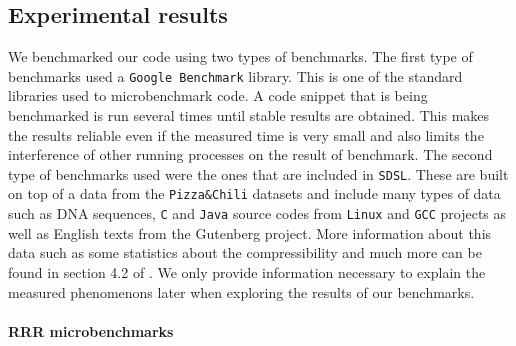 \subsection{Experimental results}

We benchmarked our code using two types of benchmarks. The first type of benchmarks used
a \texttt{Google Benchmark} library. This is one of the standard libraries used to
microbenchmark code. A code snippet that is being benchmarked is run several times until
stable results are obtained. This makes the results reliable even if the measured time is
very small and also limits the interference of other running processes on the result of
benchmark. The second type of benchmarks used were the ones that are included in \texttt{SDSL}.
These are built on top of a data from the \texttt{Pizza\&Chili} datasets \citep{ferragina2005pizza}
and include many types of data such as DNA sequences, \texttt{C} and \texttt{Java} source codes from
\texttt{Linux} and \texttt{GCC} projects as well as English texts from the Gutenberg project.
More information about this data such as some statistics about the compressibility and much
more can be found in section 4.2 of \cite{ferragina2009compressed}. We only provide information
necessary to explain the measured phenomenons later when exploring the results of our benchmarks.

\paragraph{RRR microbenchmarks}

